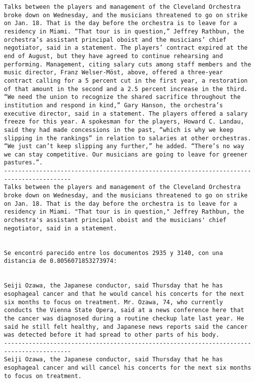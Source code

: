 \documentclass[11pt]{article}
\begin{document}
\begin{Verbatim}[commandchars=\\\{\}]
Talks between the players and management of the Cleveland Orchestra broke down on Wednesday, and the musicians threatened to go on strike on Jan. 18. That is the day before the orchestra is to leave for a residency in Miami. “That tour is in question,” Jeffrey Rathbun, the orchestra’s assistant principal oboist and the musicians’ chief negotiator, said in a statement. The players’ contract expired at the end of August, but they have agreed to continue rehearsing and performing. Management, citing salary cuts among staff members and the music director, Franz Welser-Möst, above, offered a three-year contract calling for a 5 percent cut in the first year, a restoration of that amount in the second and a 2.5 percent increase in the third. “We need the union to recognize the shared sacrifice throughout the institution and respond in kind,” Gary Hanson, the orchestra’s executive director, said in a statement. The players offered a salary freeze for this year. A spokesman for the players, Howard C. Landau, said they had made concessions in the past, “which is why we keep slipping in the rankings” in relation to salaries at other orchestras. “We just can’t keep slipping any further,” he added. “There’s no way we can stay competitive. Our musicians are going to leave for greener pastures.”.
-----------------------------------------------------------------------------------------
Talks between the players and management of the Cleveland Orchestra broke down on Wednesday, and the musicians threatened to go on strike on Jan. 18. That is the day before the orchestra is to leave for a residency in Miami. "That tour is in question," Jeffrey Rathbun, the orchestra's assistant principal oboist and the musicians' chief negotiator, said in a statement.


Se encontró parecido entre los documentos 2935 y 3140, con una distancia de 0.8056071853273974:


Seiji Ozawa, the Japanese conductor, said Thursday that he has esophageal cancer and that he would cancel his concerts for the next six months to focus on treatment. Mr. Ozawa, 74, who currently conducts the Vienna State Opera, said at a news conference here that the cancer was diagnosed during a routine checkup late last year. He said he still felt healthy, and Japanese news reports said the cancer was detected before it had spread to other parts of his body.
-----------------------------------------------------------------------------------------
Seiji Ozawa, the Japanese conductor, said Thursday that he has esophageal cancer and will cancel his concerts for the next six months to focus on treatment.



\end{Verbatim}
\end{document}

